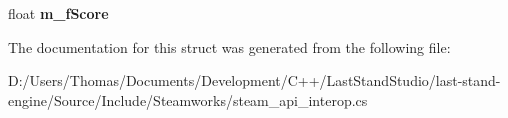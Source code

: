 \begin{DoxyCompactItemize}
\item 
\hypertarget{structValve_1_1Steamworks_1_1RemoteStorageGetPublishedItemVoteDetailsResult__t_ad84465566a52cc4b442c70279fdc4374}{}float {\bfseries m\+\_\+f\+Score}\label{structValve_1_1Steamworks_1_1RemoteStorageGetPublishedItemVoteDetailsResult__t_ad84465566a52cc4b442c70279fdc4374}

\end{DoxyCompactItemize}


The documentation for this struct was generated from the following file\+:\begin{DoxyCompactItemize}
\item 
D\+:/\+Users/\+Thomas/\+Documents/\+Development/\+C++/\+Last\+Stand\+Studio/last-\/stand-\/engine/\+Source/\+Include/\+Steamworks/steam\+\_\+api\+\_\+interop.\+cs\end{DoxyCompactItemize}

